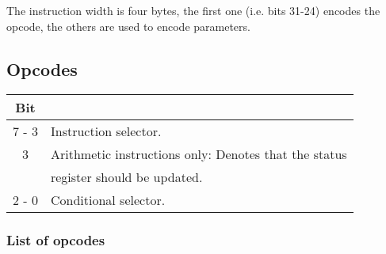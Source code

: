 \documentclass{article}
\begin{document}
The instruction width is four bytes, the first one (i.e. bits 31-24)
encodes the opcode, the others are used to encode parameters.

\subsection{Opcodes}

\begin{center}
  \begin{tabular}{c|l}
    Bit & \\
    \hline
    7 - 3  & Instruction selector. \\
    3      & Arithmetic instructions only: Denotes that the status \\
           & register should be updated. \\
    2 - 0  & Conditional selector. \\
  \end{tabular}
\end{center}

\subsubsection{List of opcodes}


\end{document}
